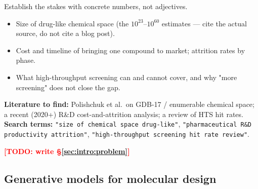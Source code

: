 \documentclass[11pt]{article}
\newcommand{\TODO}[1]{\textcolor{red}{\textbf{[TODO: #1]}}}
\begin{document}
\begin{yourturn}
Establish the stakes with concrete numbers, not adjectives.
\begin{itemize}\itemsep0pt
  \item Size of drug-like chemical space (the $10^{23}$--$10^{60}$ estimates ---
        cite the actual source, do not cite a blog post).
  \item Cost and timeline of bringing one compound to market; attrition rates
        by phase.
  \item What high-throughput screening can and cannot cover, and why "more
        screening" does not close the gap.
\end{itemize}
\textbf{Literature to find:} Polishchuk et al.\ on GDB-17 / enumerable chemical
space; a recent (2020+) R\&D cost-and-attrition analysis; a review of HTS hit
rates. \textbf{Search terms:} \texttt{"size of chemical space drug-like"},
\texttt{"pharmaceutical R\&D productivity attrition"},
\texttt{"high-throughput screening hit rate review"}.
\end{yourturn}

\TODO{write \S\ref{sec:intro:problem}}

\subsection{Generative models for molecular design}
\label{sec:intro:genmodels}
\end{document}
